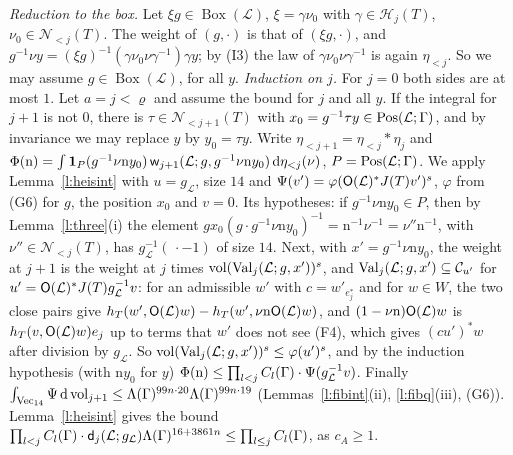 \documentclass[11pt,a4paper]{article}
\makeatletter
\theoremstyle{plainx}
\theoremstyle{uprightx}
\renewenvironment{proof}[1][Proof]{\par\pushQED{\qed}\normalfont\topsep0pt\partopsep0pt
  \trivlist\item[\hskip\labelsep\itshape #1.]\ignorespaces}{\popQED\endtrivlist\@endpefalse}
\newcommand{\cL}{\mathcal{L}}
\newcommand{\dd}{\mathrm{d}}
\newcommand{\JT}[1]{J(#1)}
\newcommand{\Hl}[2]{\mathcal{H}_{#1}(#2)}
\newcommand{\Nb}[2]{\mathcal{N}_{<#1}(#2)}
\newcommand{\gL}[1]{g_{#1}}
\newcommand{\BoxL}[1]{\operatorname{Box}(#1)}
\newcommand{\etab}[1]{\eta_{<#1}}
\newcommand{\vol}{\operatorname{vol}}
\newcommand{\Inp}[1]{\textup{(#1)}}
\makeatother
\begin{document}
\begin{proof}[Proof of Theorem B\textup{(i)}]
\emph{Reduction to the box.} Let $\xi g\in\BoxL{\cL}$, $\xi=\gamma\nu_0$ with $\gamma\in\Hl{j}{T}$,
$\nu_0\in\Nb{j}{T}$. The weight of $(g,\cdot)$ is that of $(\xi g,\cdot)$, and
$g^{-1}\nu y=(\xi g)^{-1}(\gamma\nu_0\nu\gamma^{-1})\gamma y$; by \Inp{I3} the law of $\gamma\nu_0\nu\gamma^{-1}$ is
again $\etab{j}$. So we may assume $g\in\BoxL{\cL}$, for all $y$. \emph{Induction on $j$.} For $j=0$ both sides
are at most $1$. Let $a=j<\varrho$ and assume the bound for $j$ and all $y$. If the integral for $j+1$ is not $0$,
there is $\tau\in\Nb{j+1}{T}$ with $x_0=g^{-1}\tau y\in\positionsOfSize{\cL}{\Gamma}$, and by invariance we may
replace $y$ by $y_0=\tau y$. Write $\etab{j+1}=\etab{j}*\eta_j$ and
$\Phi(\mathrm{n})=\int\mathbf{1}_{P}(g^{-1}\nu\mathrm{n}y_0)\,\floorWeight{\cL}{j+1}{g}{g^{-1}\nu\mathrm{n}y_0}\,\dd\etab{j}(\nu)$,
$P=\positionsOfSize{\cL}{\Gamma}$. We apply Lemma~\ref{l:heisint} with $u=\gL{\cL}$, size $14$ and
$\Psi(v')=\varphi(\orthonormalPart{\cL}^{*}\JT{T}v')^{s}$, $\varphi$ from (G6) for $g$, the position $x_0$ and
$v=0$. Its hypotheses: if $g^{-1}\nu\mathrm{n}y_0\in P$, then by Lemma~\ref{l:three}(i) the element
$gx_0(g\cdot g^{-1}\nu\mathrm{n}y_0)^{-1}=\mathrm{n}^{-1}\nu^{-1}=\nu''\mathrm{n}^{-1}$, with $\nu''\in\Nb{j}{T}$, has
$\gL{\cL}^{-1}(\,\cdot-1)$ of size $14$. Next, with $x'=g^{-1}\nu\mathrm{n}y_0$, the weight at $j+1$ is the weight at
$j$ times $\vol(\floorValues{\cL}{j}{g}{x'})^{s}$, and $\floorValues{\cL}{j}{g}{x'}\subseteq\mathcal{C}_{u'}$ for
$u'=\orthonormalPart{\cL}^{*}\JT{T}\gL{\cL}^{-1}v$: for an admissible $w'$ with $c=w'_{e^*_j}$ and for $w\in W$,
the two close pairs give $h_T(w',\orthonormalPart{\cL}w)-h_T(w',\nu\mathrm{n}\orthonormalPart{\cL}w)$, and
$(1-\nu\mathrm{n})\orthonormalPart{\cL}w$ is $h_T(v,\orthonormalPart{\cL}w)e_j$ up to terms that $w'$ does not see
(F4), which gives $(cu')^{*}w$ after division by $\gL{\cL}$. So
$\vol(\floorValues{\cL}{j}{g}{x'})^{s}\le\varphi(u')^{s}$, and by the induction hypothesis (with $\mathrm{n}y_0$
for $y$) $\Phi(\mathrm{n})\le\prod_{l<j}\floorConst{\Gamma}{l}\cdot\Psi(\gL{\cL}^{-1}v)$. Finally
$\int_{\vecsOfSize{14}}\Psi\,\dd\vol_{j+1}\le\Lambda(\Gamma)^{99n\cdot20}\Lambda(\Gamma)^{99n\cdot19}$
(Lemmas~\ref{l:fibint}(ii), \ref{l:fibq}(iii), (G6)). Lemma~\ref{l:heisint} gives the bound
$\prod_{l<j}\floorConst{\Gamma}{l}\cdot\floorModulus{\cL}{j}{\gL{\cL}}\Lambda(\Gamma)^{16+3861n}
\le\prod_{l\le j}\floorConst{\Gamma}{l}$, as $c_A\ge1$.
\end{proof}
\end{document}
